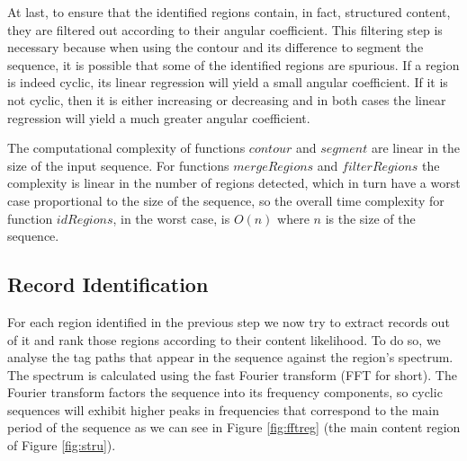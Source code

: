 \documentclass{vldb}
\begin{document}
At last, to ensure that the identified regions contain, in fact, structured
content, they are filtered out according to their angular coefficient. This
filtering step is necessary because when using the contour and its difference to
segment the sequence, it is possible that some of the identified regions are
spurious. If a region is indeed cyclic, its linear regression will yield a small
angular coefficient. If it is not cyclic, then it is either increasing or
decreasing and in both cases the linear regression will yield a much greater
angular coefficient.

The computational complexity of functions $contour$ and $segment$ are linear in
the size of the input sequence. For functions $mergeRegions$ and $filterRegions$
the complexity is linear in the number of regions detected, which in turn have a
worst case proportional to the size of the sequence, so the overall time
complexity for function $idRegions$, in the worst case, is $O(n)$ where $n$ is
the size of the sequence.

\subsection{Record Identification}\label{ss:reci}

For each region identified in the previous step we now try to extract records
out of it and rank those regions according to their content likelihood. To do
so, we analyse the tag paths that appear in the sequence against the region's
spectrum. The spectrum is calculated using the fast Fourier
transform\cite{fft1965} (FFT for short). The Fourier transform factors the
sequence into its frequency components, so cyclic sequences will exhibit higher
peaks in frequencies that correspond to the main period of the sequence as we
can see in Figure \ref{fig:fftreg} (the main content region of Figure
\ref{fig:stru}).
\end{document}
